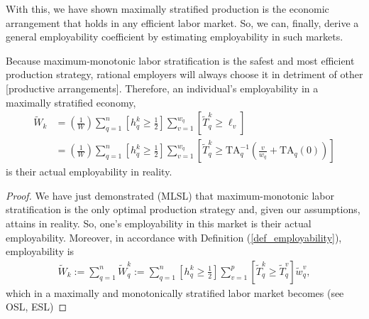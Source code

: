 \documentclass[hidelinks, nonatbib]{elsarticle}
\begin{document}
With this, we have shown maximally stratified production is the economic arrangement that holds in any efficient labor market. So, we can, finally, derive a general employability coefficient by estimating employability in such markets.
\begin{get_theorem}[GET]
    Because maximum-monotonic labor stratification is the safest and most efficient production strategy, rational employers will always choose it in detriment of other [productive arrangements]. Therefore, an individual's employability in a maximally stratified economy,
    \begin{align}
        \tilde{W}_k 
        &=
        \left(
            \frac{1}{W}
        \right)
        \sum_{q=1}^{n}
        \left[
            h_{q}^{k}
            \geq
            \frac{1}{2}
        \right]
        \sum_{v=1}^{w_q}
        \left[
            \tilde{T}_{q}^{k}
            \geq
            \ell_v
        \right]
        \\
        &=
        \left(
            \frac{1}{W}
        \right)
        \sum_{q=1}^{n}
        \left[
            h_{q}^{k}
            \geq
            \frac{1}{2}
        \right]
        \sum_{v=1}^{w_q}
        \left[
            \tilde{T}_{q}^{k}
            \geq
            \text{TA}_{q}^{-1}
            \left(
                \frac{v}{w_q}
                +
                \text{TA}_{q}(0)
            \right)
        \right]
    \end{align}
    is their actual employability in reality.
    \begin{proof}
        We have just demonstrated (MLSL) that maximum-monotonic labor stratification is the only optimal production strategy and, given our assumptions, attains in reality. So, one's employability in this market is their actual employability.
        Moreover, in accordance with Definition (\ref{def_employability}), employability is
        \begin{gather}
            \tilde{W}_{k}
            :=
            \sum_{q=1}^{n}
            \tilde{W}_{q}^{k}
            :=
            \sum_{q=1}^{n}
            \left[
                h_{q}^{k}
                \geq
                \frac{1}{2}
            \right]
            \sum_{v=1}^{p}
            \left[
                \tilde{T}_{q}^{k}
                \geq
                \tilde{T}_{q}^{v}
            \right]
            \tilde{w}_{q}^{v}
            ,
        \end{gather}
        which in a maximally and monotonically stratified labor market becomes (see OSL, ESL)

\end{proof}
\end{get_theorem}
\end{document}

